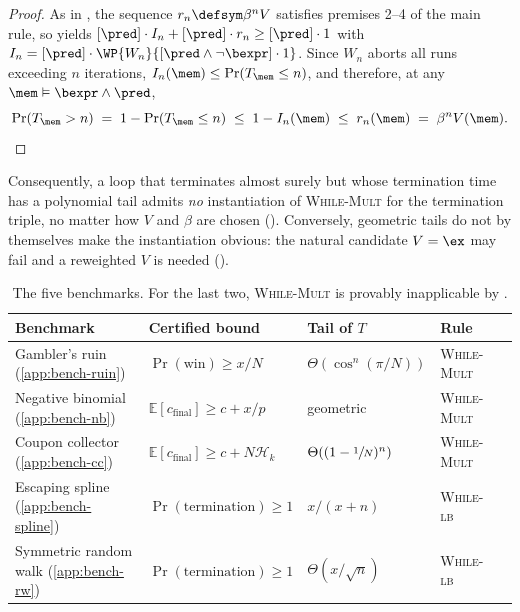 \begin{proof}
As in , the sequence $r_n \defsym \beta^n V$ satisfies
premises 2--4 of the main rule, so  yields
$[\pred]\cdot I_n + [\pred]\cdot r_n \geq [\pred]\cdot 1$ with
$I_n = [\pred]\cdot\WP{W_n}{[\pred\wedge\neg\bexpr]\cdot 1}$. Since $W_n$
aborts all runs exceeding $n$ iterations,
$I_n(\mem) \leq \Pr(T_\mem \leq n)$, and therefore, at any
$\mem \vDash \bexpr \land \pred$,
\[
  \Pr(T_\mem > n)
  \;=\; 1 - \Pr(T_\mem \leq n)
  \;\leq\; 1 - I_n(\mem)
  \;\leq\; r_n(\mem)
  \;=\; \beta^n V(\mem).
  \qedhere
\]
\end{proof}

Consequently, a loop that terminates almost surely but whose termination time
has a polynomial tail admits \emph{no} instantiation of \textsc{While-Mult}
for the termination triple, no matter how $V$ and $\beta$ are chosen
(). Conversely, geometric tails do not by
themselves make the instantiation obvious: the natural candidate $V = \ex$
may fail and a reweighted $V$ is needed
().

\begin{table}[H]
  \centering
  \small
  \begin{tabular}{lllll}
    \toprule
    Benchmark & Certified bound & Tail of $T$ & Rule \\
    \midrule
    Gambler's ruin (\ref{app:bench-ruin})
      & $\Pr(\text{win}) \geq x/N$
      & $\Theta(\cos^n(\pi/N))$
      & \textsc{While-Mult} \\
    Negative binomial (\ref{app:bench-nb})
      & $\mathbb{E}[c_{\text{final}}] \geq c + x/p$
      & geometric
      & \textsc{While-Mult} \\
    Coupon collector (\ref{app:bench-cc})
      & $\mathbb{E}[c_{\text{final}}] \geq c + N\mathcal{H}_k$
      & $\Theta((1-\sfrac{1}{N})^n)$
      & \textsc{While-Mult} \\
    Escaping spline (\ref{app:bench-spline})
      & $\Pr(\text{termination}) \geq 1$
      & $x/(x+n)$
      & \textsc{While-lb} \\
    Symmetric random walk (\ref{app:bench-rw})
      & $\Pr(\text{termination}) \geq 1$
      & $\Theta(x/\sqrt{n})$
      & \textsc{While-lb} \\
    \bottomrule
  \end{tabular}
  \caption{The five benchmarks. For the last two, \textsc{While-Mult} is
  provably inapplicable by .}
\end{table}

